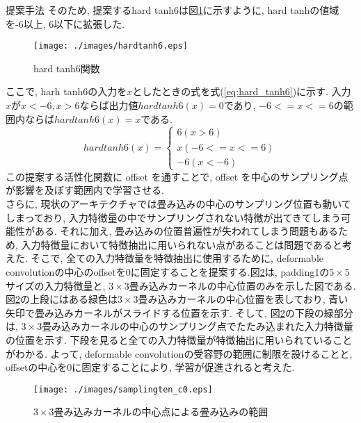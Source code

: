 \begin{chapter}{提案手法}
そのため, 提案するhard tanh6は図\ref{fig:hardtanh6}に示すように, hard tanhの値域を-6以上, 6以下に拡張した. 
\begin{figure}[H]
  \centering
  \texttt{[image: ./images/hardtanh6.eps]}
  \caption{hard tanh6関数}
  \label{fig:hardtanh6}
\end{figure}
ここで, harh tanh6の入力を$x$としたときの式を式(\ref{eq:hard_tanh6})に示す. 入力$x$が$x<-6, x>6$ならば出力値$hardtanh6(x) =0$であり, $-6<=x<=6$の範囲内ならば$hardtanh6(x)=x$である. 
\begin{equation}
  hardtanh6(x) = 
      \begin{cases}
        6  (x>6)\\ 
        x  (-6<=x<=6)\\
        -6  (x<-6) \label{eq:hard_tanh6}
      \end{cases}
\end{equation}
この提案する活性化関数に offset を通すことで, offset を中心のサンプリング点が影響を及ぼす範囲内で学習させる. \\
さらに, 現状のアーキテクチャでは畳み込みの中心のサンプリング位置も動いてしまっており, 入力特徴量の中でサンプリングされない特徴が出てきてしまう可能性がある.
それに加え, 畳み込みの位置普遍性が失われてしまう問題もあるため, 入力特徴量において特徴抽出に用いられない点があることは問題であると考えた.
そこで, 全ての入力特徴量を特徴抽出に使用するために, deformable convolutionの中心のoffsetを0に固定することを提案する.図\ref{fig:defconv_c0_offset}は, padding1の$5\times5$サイズの入力特徴量と, $3\times3$畳み込みカーネルの中心位置のみを示した図である. 図\ref{fig:defconv_c0_offset}の上段にはある緑色は$3\times3$畳み込みカーネルの中心位置を表しており, 青い矢印で畳み込みカーネルがスライドする位置を示す. そして, 図\ref{fig:defconv_c0_offset}の下段の緑部分は, $3\times3$畳み込みカーネルの中心のサンプリング点でたたみ込まれた入力特徴量の位置を示す. 下段を見ると全ての入力特徴量が特徴抽出に用いられていることがわかる.
よって, deformable convolutionの受容野の範囲に制限を設けることと, offsetの中心を0に固定することにより, 学習が促進されると考えた.

\begin{figure}[H]
  \centering
  \texttt{[image: ./images/samplingten\_c0.eps]}
  \caption{$3\times3$畳み込みカーネルの中心点による畳み込みの範囲}
  \label{fig:defconv_c0_offset}
\end{figure}

\end{chapter}
